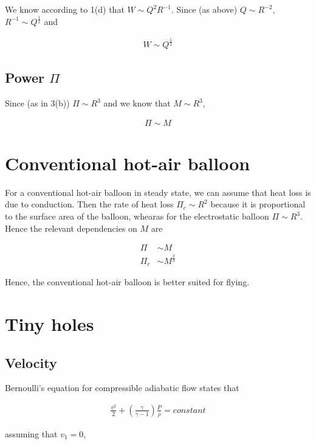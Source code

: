 \documentclass{article}
\begin{document}
We know according to 1(d) that $W \sim Q^2 R^{-1}$. Since (as above) $Q \sim R^{-2}$, $R^{-1} \sim Q^{\frac{1}{2}}$ and

\begin{align*}
W \sim Q^\frac{5}{2}
\end{align*}

\subsection{Power $\Pi$}

Since (as in 3(b)) $\Pi \sim R^{3}$ and we know that $M \sim R^3$,

\begin{align*}
\Pi \sim M
\end{align*}

\section{Conventional hot-air balloon}

For a conventional hot-air balloon in steady state, we can assume that heat loss is due to conduction. Then the rate of heat loss $\Pi_c \sim R^2$ because it is proportional to the surface area of the balloon, whearas for the electrostatic balloon $\Pi \sim R^3$. Hence the relevant dependencies on $M$ are

\begin{align*}
\Pi &\sim M \\
\Pi_c &\sim M^{\frac{2}{3}}
\end{align*}

Hence, the conventional hot-air balloon is better suited for flying.

\section{Tiny holes}

\subsection{Velocity}

Bernoulli's equation for compressible adiabatic flow states that

\begin{align*}
\frac{v^2}{2} + \left(\frac{\gamma}{\gamma - 1}\right)\frac{P}{\rho} = constant
\end{align*}

assuming that $v_1 = 0$,
\end{document}
